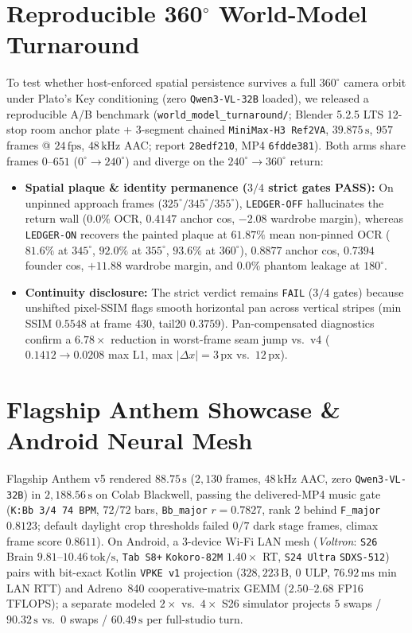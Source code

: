 \documentclass[10pt,twocolumn]{article}
\begin{document}
\section{Reproducible 360\texorpdfstring{$^\circ$}{ deg} World-Model Turnaround}
To test whether host-enforced spatial persistence survives a full $360^\circ$ camera orbit under Plato's Key conditioning (zero \texttt{Qwen3-VL-32B} loaded), we released a reproducible A/B benchmark (\texttt{world\_model\_turnaround/}; Blender 5.2.5 LTS 12-stop room anchor plate + 3-segment chained \texttt{MiniMax-H3 Ref2VA}, $39.875\,\text{s}$, $957$ frames @ $24\,\text{fps}$, $48\,\text{kHz}$ AAC; report \texttt{28edf210}, MP4 \texttt{6fdde381}). Both arms share frames $0\text{--}651$ ($0^\circ\to 240^\circ$) and diverge on the $240^\circ\to 360^\circ$ return:
\begin{itemize}[leftmargin=1.2em,itemsep=1.5pt]
\item \textbf{Spatial plaque \& identity permanence ($3/4$ strict gates PASS):} On unpinned approach frames ($325^\circ/345^\circ/355^\circ$), \texttt{LEDGER-OFF} hallucinates the return wall ($0.0\%$ OCR, $0.4147$ anchor cos, $-2.08$ wardrobe margin), whereas \texttt{LEDGER-ON} recovers the painted plaque at $61.87\%$ mean non-pinned OCR ($81.6\%$ at $345^\circ$, $92.0\%$ at $355^\circ$, $93.6\%$ at $360^\circ$), $0.8877$ anchor cos, $0.7394$ founder cos, $+11.88$ wardrobe margin, and $0.0\%$ phantom leakage at $180^\circ$.
\item \textbf{Continuity disclosure:} The strict verdict remains \texttt{FAIL} ($3/4$ gates) because unshifted pixel-SSIM flags smooth horizontal pan across vertical stripes (min SSIM $0.5548$ at frame $430$, tail20 $0.3759$). Pan-compensated diagnostics confirm a $6.78\times$ reduction in worst-frame seam jump vs.\ v4 ($0.1412 \to 0.0208$ max L1, max $|\Delta x| = 3\,\text{px}$ vs.\ $12\,\text{px}$).
\end{itemize}

\section{Flagship Anthem Showcase \& Android Neural Mesh}
Flagship Anthem v5 rendered $88.75\,\text{s}$ ($2{,}130$ frames, $48\,\text{kHz}$ AAC, zero \texttt{Qwen3-VL-32B}) in $2{,}188.56\,\text{s}$ on Colab Blackwell, passing the delivered-MP4 music gate (\texttt{K:Bb 3/4 74 BPM}, $72/72$ bars, \texttt{Bb\_major} $r=0.7827$, rank 2 behind \texttt{F\_major} $0.8123$; default daylight crop thresholds failed $0/7$ dark stage frames, climax frame score $0.8611$). On Android, a 3-device Wi-Fi LAN mesh (\emph{Voltron}: \texttt{S26} Brain $9.81\text{--}10.46\,\text{tok/s}$, \texttt{Tab S8+} \texttt{Kokoro-82M} $1.40\times$ RT, \texttt{S24 Ultra} \texttt{SDXS-512}) pairs with bit-exact Kotlin \texttt{VPKE v1} projection ($328{,}223\,\text{B}$, $0$ ULP, $76.92\,\text{ms}$ min LAN RTT) and Adreno~840 cooperative-matrix GEMM ($2.50\text{--}2.68$ FP16 TFLOPS); a separate modeled $2\times$ vs.\ $4\times$ S26 simulator projects $5$ swaps / $90.32\,\text{s}$ vs.\ $0$ swaps / $60.49\,\text{s}$ per full-studio turn.
\end{document}
